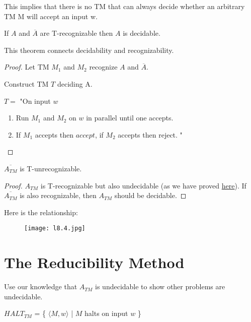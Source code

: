 This implies that there is no TM that can always decide whether an arbitrary TM M  will accept an input w. 

\begin{theorem}
    If \(A\)  and \(\overline{A}\) are T-recognizable then \(A\) is decidable. 
\end{theorem}

This theorem connects decidability and recognizability.

\begin{proof} \label{theorem: A(TM) not decidable}
    Let TM \(M_1\) and \(M_2\) recognize \(A\) and \(\overline{A}\).     

    Construct TM \(T\) deciding A. 

    \(T = \) "On input \(w\)
    \begin{enumerate}
        \item Run \(M_1\) and \(M_2\) on \(w\) in parallel until one accepts.
        \item If \(M_1\) accepts then \(accept\), if \(M_2\) accepts then reject. "
    \end{enumerate}  
\end{proof}

\begin{corollary}
    \(\overline{A_{TM}}\) is T-unrecognizable. 
\end{corollary}
\begin{proof}
    \(A_{TM}\) is T-recognizable but also undecidable (as we have proved \hyperref[theorem: undecidable language]{here}). 
    If \(\overline{A_{TM}}\) is also recognizable, then \(A_{TM}\) should be decidable.  
\end{proof}

Here is the relationship:
    \begin{figure}[H]
    \centering
    \texttt{[image: l8.4.jpg]}
    \caption{}
    \end{figure}

\section{The Reducibility Method}

Use our knowledge that \(A_{TM}\) is undecidable to show other problems are undecidable. 

\begin{definition}
    \(HALT_{TM}\) = \{ \( \langle M, w \rangle\) | \(M\) halts on input \(w\) \}  
\end{definition}

